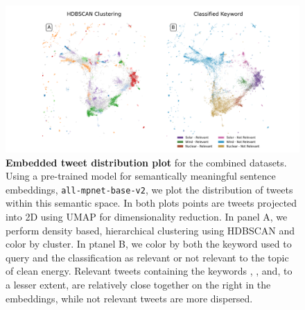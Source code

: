

\begin{figure}
  \centerfloat	
        \includegraphics[width=2.8\columnwidth]{figures/combined_labeled_embedding_horizontal.png} 
  \caption{\textbf{Embedded tweet distribution plot} for the combined datasets.
  Using a pre-trained model for semantically meaningful sentence embeddings, \texttt{all-mpnet-base-v2}, we plot the distribution of tweets within this semantic space.
  In both plots points are tweets projected into 2D using UMAP for dimensionality reduction.
  In panel A, we perform density based, hierarchical clustering using HDBSCAN and color by cluster.
  In ptanel B, we color by both the keyword used to query and the classification as relevant or not relevant to the topic of clean energy. 
  Relevant tweets containing the keywords , , and, to a lesser extent,  are relatively close together on the right in the embeddings, while not relevant tweets are more dispersed.} 
    \label{fig:combined_embeddings}
\end{figure}



